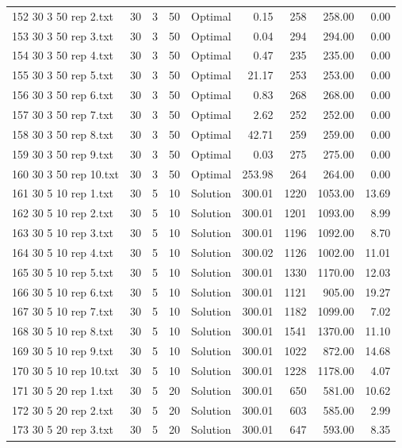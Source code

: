 \begin{longtable}{lrrllrrrr}
152 30 3 50 rep 2.txt & 30 & 3 & 50 & Optimal &  0.15 & 258 & 258.00 &  0.00\\
153 30 3 50 rep 3.txt & 30 & 3 & 50 & Optimal &  0.04 & 294 & 294.00 &  0.00\\
154 30 3 50 rep 4.txt & 30 & 3 & 50 & Optimal &  0.47 & 235 & 235.00 &  0.00\\
155 30 3 50 rep 5.txt & 30 & 3 & 50 & Optimal & 21.17 & 253 & 253.00 &  0.00\\
156 30 3 50 rep 6.txt & 30 & 3 & 50 & Optimal &  0.83 & 268 & 268.00 &  0.00\\
157 30 3 50 rep 7.txt & 30 & 3 & 50 & Optimal &  2.62 & 252 & 252.00 &  0.00\\
158 30 3 50 rep 8.txt & 30 & 3 & 50 & Optimal & 42.71 & 259 & 259.00 &  0.00\\
159 30 3 50 rep 9.txt & 30 & 3 & 50 & Optimal &  0.03 & 275 & 275.00 &  0.00\\
160 30 3 50 rep 10.txt & 30 & 3 & 50 & Optimal & 253.98 & 264 & 264.00 &  0.00\\
161 30 5 10 rep 1.txt & 30 & 5 & 10 & Solution & 300.01 & 1220 & 1053.00 & 13.69\\
162 30 5 10 rep 2.txt & 30 & 5 & 10 & Solution & 300.01 & 1201 & 1093.00 &  8.99\\
163 30 5 10 rep 3.txt & 30 & 5 & 10 & Solution & 300.01 & 1196 & 1092.00 &  8.70\\
164 30 5 10 rep 4.txt & 30 & 5 & 10 & Solution & 300.02 & 1126 & 1002.00 & 11.01\\
165 30 5 10 rep 5.txt & 30 & 5 & 10 & Solution & 300.01 & 1330 & 1170.00 & 12.03\\
166 30 5 10 rep 6.txt & 30 & 5 & 10 & Solution & 300.01 & 1121 & 905.00 & 19.27\\
167 30 5 10 rep 7.txt & 30 & 5 & 10 & Solution & 300.01 & 1182 & 1099.00 &  7.02\\
168 30 5 10 rep 8.txt & 30 & 5 & 10 & Solution & 300.01 & 1541 & 1370.00 & 11.10\\
169 30 5 10 rep 9.txt & 30 & 5 & 10 & Solution & 300.01 & 1022 & 872.00 & 14.68\\
170 30 5 10 rep 10.txt & 30 & 5 & 10 & Solution & 300.01 & 1228 & 1178.00 &  4.07\\
171 30 5 20 rep 1.txt & 30 & 5 & 20 & Solution & 300.01 & 650 & 581.00 & 10.62\\
172 30 5 20 rep 2.txt & 30 & 5 & 20 & Solution & 300.01 & 603 & 585.00 &  2.99\\
173 30 5 20 rep 3.txt & 30 & 5 & 20 & Solution & 300.01 & 647 & 593.00 &  8.35\\

\end{longtable}
